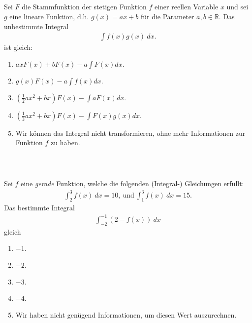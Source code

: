 \subsection*{}
Sei $ F $ die Stammfunktion der stetigen Funktion $ f $ einer reellen Variable $ x $ und sei $ g $ eine lineare Funktion, d.h. $ g(x) = ax +b $ für die Parameter $ a,b \in \mathbb{R} $. Das unbestimmte Integral
\begin{align*}
  \int f(x) g(x) \ dx.
\end{align*}
ist gleich:
\renewcommand{\labelenumi}{(\alph{enumi})}
\begin{enumerate}
\item 
$ a x F(x) + b F(x) - a \int F(x) dx$.
\item 
$ g(x) F(x) - a \int f(x) dx$.
\item 
$ \left(\frac{1}{2} a x^2 +b x\right) F(x) - \int a F(x) dx$.
\item
$ \left(\frac{1}{2} a x^2 +b x\right) F(x) - \int  F(x) g(x) dx$.
\item 
Wir können das Integral nicht transformieren, ohne mehr Informationen zur Funktion $ f $ zu haben.
\end{enumerate}
\ \\
\subsection*{}
Sei $ f $ eine \textit{gerade} Funktion, welche die folgenden (Integral-) Gleichungen erfüllt:
\begin{align*}
	\int_{2}^3 f(x) \ dx = 10, \ \textrm{und} \
	\int_1^3 f(x) \ dx = 15.
\end{align*}
Das bestimmte Integral
\begin{align*}
	\int_{-2}^{-1} (2 - f(x) ) \ dx
\end{align*}  
gleich
\renewcommand{\labelenumi}{(\alph{enumi})}
\begin{enumerate}
	\item 
	$ -1 $.
	\item
	$ -2 $.
	\item
	$ -3 $.
	\item
	$ -4 $.
	\item
	Wir haben nicht genügend Informationen, um diesen Wert auszurechnen.
\end{enumerate}
\ \\
